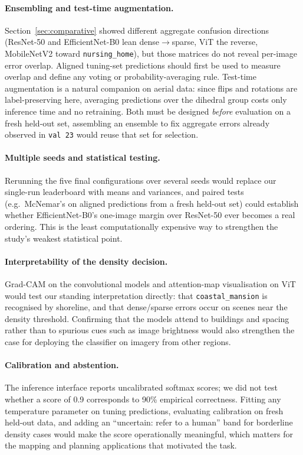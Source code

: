 \documentclass[11pt,twoside,a4paper]{article}
\begin{document}
\paragraph{Ensembling and test-time augmentation.}
Section~\ref{sec:comparative} showed different aggregate confusion directions
(ResNet-50 and EfficientNet-B0 lean dense$\rightarrow$sparse, ViT the reverse,
MobileNetV2 toward \texttt{nursing\_home}), but those matrices do not reveal
per-image error overlap. Aligned tuning-set predictions should first be used to
measure overlap and define any voting or probability-averaging rule.
Test-time augmentation is a natural companion on aerial data: since flips
and rotations are label-preserving here, averaging predictions over the
dihedral group costs only inference time and no retraining. Both must be
designed \emph{before} evaluation on a fresh held-out set, assembling an
ensemble to fix aggregate errors already observed in \texttt{val 23} would
reuse that set for selection.

\paragraph{Multiple seeds and statistical testing.}
Rerunning the five final configurations over several seeds would replace our
single-run leaderboard with means and variances, and paired tests (e.g.\
McNemar's on aligned predictions from a fresh held-out set) could establish whether
EfficientNet-B0's one-image margin over ResNet-50 ever becomes a real
ordering. This is the least computationally expensive way to strengthen the
study's weakest statistical point.

\paragraph{Interpretability of the density decision.}
Grad-CAM on the convolutional models and attention-map visualisation on ViT
would test our standing interpretation directly: that
\texttt{coastal\_mansion} is recognised by shoreline, and that dense/sparse
errors occur on scenes near the density threshold. Confirming that the
models attend to buildings and spacing rather than to spurious cues such
as image brightness would also strengthen the case for deploying the
classifier on imagery from other regions.

\paragraph{Calibration and abstention.}
The inference interface reports uncalibrated softmax scores; we did not test
whether a score of 0.9 corresponds to 90\% empirical correctness. Fitting any
temperature parameter on tuning predictions, evaluating calibration on fresh
held-out data, and adding an
``uncertain: refer to a human'' band for borderline density cases would
make the score operationally meaningful, which matters for the
mapping and planning applications that motivated the task.
\end{document}
